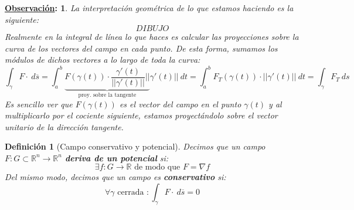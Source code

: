 \documentclass[10pt,a4paper,openright]{book}
\theoremstyle{break}
\newtheorem*{defi}{Definición}
\newtheorem*{obs}{\underline{Observación}:}
\newcommand{\dif}[1]{\ d#1}
\begin{document}
\begin{obs}
La interpretación geométrica de lo que estamos haciendo es la siguiente:
$$DIBUJO$$
Realmente en la integral de línea lo que haces es calcular las proyecciones sobre la curva de los vectores del campo en cada punto. De esta forma, sumamos los módulos de dichos vectores a lo largo de toda la curva:
$$\int_{\gamma} F\cdot \dif{\overline{s}} = \int_{a}^{b} \underbrace{F\left( \gamma\left( t \right) \right) \cdot \frac{\gamma'\left( t \right)}{\lvert \lvert \gamma'\left( t \right) \rvert \rvert} \lvert \lvert}_{\text{proy. sobre la tangente}} \gamma'\left( t \right) \rvert \rvert \dif{t} = \int_{a}^{b} F_T \left( \gamma\left( t \right) \right) \cdot \lvert \lvert \gamma'\left( t \right) \rvert \rvert \dif{t} = \int_{\gamma} F_T \dif{s}$$
Es sencillo ver que $F(\gamma(t))$ es el vector del campo en el punto $\gamma(t)$ y al multiplicarlo por el cociente siguiente, estamos proyectándolo sobre el vector unitario de la dirección tangente.
\end{obs}

\begin{defi}[Campo conservativo y potencial]
Decimos que un campo $F:G\subset \mathbb{R}^n\rightarrow \mathbb{R}^n$ \textbf{deriva de un potencial} si: 
$$\exists f: G \rightarrow \mathbb{R} \text{ de modo que } F = \nabla f$$
Del mismo modo, decimos que un campo es \textbf{conservativo} si: 
$$\forall \gamma \text{ cerrada }:\int_{\gamma} F\cdot \dif{\overline{s}} = 0$$
\end{defi}
\end{document}
